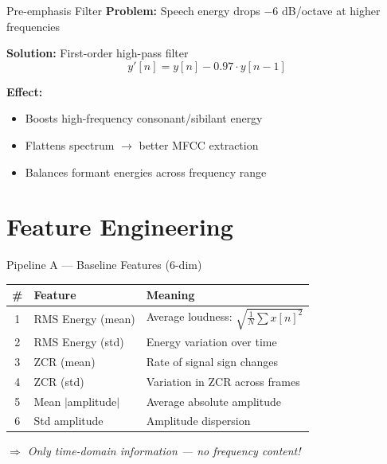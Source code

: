\documentclass[aspectratio=169]{beamer}
\begin{document}
\begin{frame}{Pre-emphasis Filter}
\textbf{Problem:} Speech energy drops $-6$ dB/octave at higher frequencies

\vspace{0.3cm}
\textbf{Solution:} First-order high-pass filter
$$y'[n] = y[n] - 0.97 \cdot y[n-1]$$

\vspace{0.3cm}
\textbf{Effect:}
\begin{itemize}
    \item Boosts high-frequency consonant/sibilant energy
    \item Flattens spectrum $\rightarrow$ better MFCC extraction
    \item Balances formant energies across frequency range
\end{itemize}
\end{frame}

\section{Feature Engineering}
\begin{frame}{Pipeline A — Baseline Features (6-dim)}
\begin{table}
\centering
\begin{tabular}{clp{7cm}}
\toprule
\textbf{\#} & \textbf{Feature} & \textbf{Meaning} \\
\midrule
1 & RMS Energy (mean) & Average loudness: $\sqrt{\frac{1}{N}\sum x[n]^2}$ \\
2 & RMS Energy (std) & Energy variation over time \\
3 & ZCR (mean) & Rate of signal sign changes \\
4 & ZCR (std) & Variation in ZCR across frames \\
5 & Mean $|$amplitude$|$ & Average absolute amplitude \\
6 & Std amplitude & Amplitude dispersion \\
\bottomrule
\end{tabular}
\end{table}

\vspace{0.2cm}
\begin{center}
\textit{$\Rightarrow$ Only time-domain information — no frequency content!}
\end{center}
\end{frame}
\end{document}
